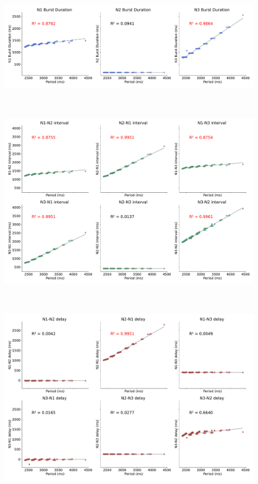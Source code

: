 \begin{figure}[hbt!]
\begin{minipage}[b]{0.53\textwidth}
\begin{minipage}[b]{\textwidth}
			\centering
			\includegraphics[width=\textwidth]{invariants/data/MODEL/n1m_driven/images/3phases/_durations.pdf}
		\end{minipage}\
		\begin{minipage}[b]{\textwidth}
			\centering
			\includegraphics[width=\textwidth]{invariants/data/MODEL/n1m_driven/images/3phases/_intervals.pdf}
		\end{minipage}\
		\begin{minipage}[b]{\textwidth}
			\centering
			\includegraphics[width=\textwidth]{invariants/data/MODEL/n1m_driven/images/3phases/_delays.pdf}

\end{minipage}
\end{minipage}
\end{figure}
